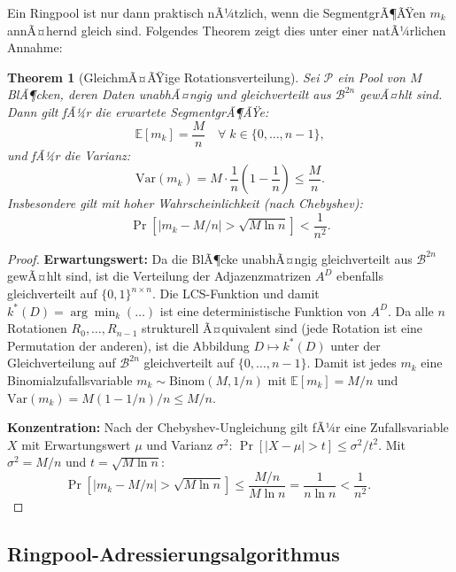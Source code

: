 ﻿\documentclass[a4paper,12pt]{article}
\theoremstyle{definition}
\theoremstyle{plain}
\newtheorem{theorem}{Theorem}[section]
\begin{document}
Ein Ringpool ist nur dann praktisch nÃ¼tzlich, wenn die SegmentgrÃ¶ÃŸen
$m_k$ annÃ¤hernd gleich sind.  Folgendes Theorem zeigt dies unter einer
natÃ¼rlichen Annahme:

\begin{theorem}[GleichmÃ¤ÃŸige Rotationsverteilung]
\label{thm:gleichmaessig}
  Sei $\mathcal{P}$ ein Pool von $M$ BlÃ¶cken, deren Daten unabhÃ¤ngig
  und gleichverteilt aus $\mathcal{B}^{2n}$ gewÃ¤hlt sind.
  Dann gilt fÃ¼r die erwartete SegmentgrÃ¶ÃŸe:
  \[
    \mathbb{E}[m_k] = \frac{M}{n}
    \quad \forall\; k \in \{0, \ldots, n-1\},
  \]
  und fÃ¼r die Varianz:
  \[
    \mathrm{Var}(m_k) = M \cdot \frac{1}{n}\left(1 - \frac{1}{n}\right)
    \le \frac{M}{n}.
  \]
  Insbesondere gilt mit hoher Wahrscheinlichkeit (nach Chebyshev):
  \[
    \Pr\!\left[|m_k - M/n| > \sqrt{M \ln n}\right]
    < \frac{1}{n^2}.
  \]
\end{theorem}

\begin{proof}
  \textbf{Erwartungswert:} Da die BlÃ¶cke unabhÃ¤ngig gleichverteilt aus
  $\mathcal{B}^{2n}$ gewÃ¤hlt sind, ist die Verteilung der Adjazenzmatrizen
  $A^D$ ebenfalls gleichverteilt auf $\{0,1\}^{n \times n}$.  Die LCS-Funktion
  und damit $k^*(D) = \arg\min_k(\ldots)$ ist eine deterministische
  Funktion von $A^D$.  Da alle $n$ Rotationen $R_0, \ldots, R_{n-1}$
  strukturell Ã¤quivalent sind (jede Rotation ist eine Permutation der
  anderen), ist die Abbildung $D \mapsto k^*(D)$ unter der Gleichverteilung
  auf $\mathcal{B}^{2n}$ gleichverteilt auf $\{0, \ldots, n-1\}$.
  Damit ist jedes $m_k$ eine Binomialzufallsvariable
  $m_k \sim \mathrm{Binom}(M, 1/n)$ mit
  $\mathbb{E}[m_k] = M/n$ und $\mathrm{Var}(m_k) = M(1-1/n)/n \le M/n$.

  \textbf{Konzentration:} Nach der Chebyshev-Ungleichung gilt fÃ¼r eine
  Zufallsvariable $X$ mit Erwartungswert $\mu$ und Varianz $\sigma^2$:
  $\Pr[|X - \mu| > t] \le \sigma^2/t^2$.
  Mit $\sigma^2 = M/n$ und $t = \sqrt{M \ln n}$:
  \[
    \Pr\!\left[|m_k - M/n| > \sqrt{M \ln n}\right]
    \le \frac{M/n}{M \ln n} = \frac{1}{n \ln n} < \frac{1}{n^2}. \qquad 
  \]
\end{proof}

\subsection{Ringpool-Adressierungsalgorithmus}
\label{ssec:ringpool_algo}
\end{document}
